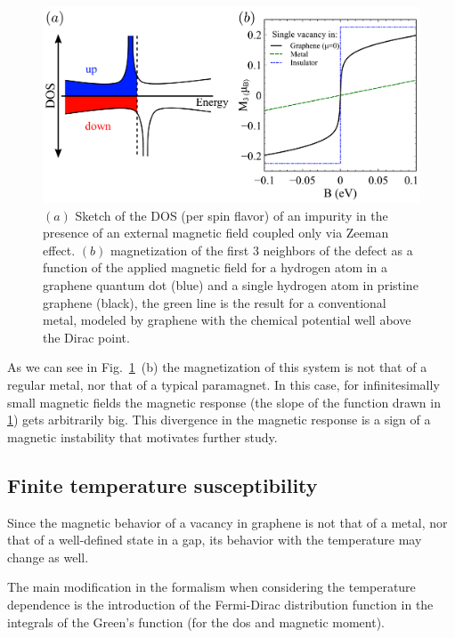 \begin{figure}[h!]
\centering
\includegraphics{chapter05/figures/comparison.pdf}
\vspace{-5pt}
\caption{$(a)$ Sketch of the DOS (per spin flavor) of an impurity in the presence of an external magnetic field coupled only via Zeeman effect. $(b)$ magnetization of the first 3 neighbors of the defect as a function of the applied magnetic field for a hydrogen atom in a graphene quantum dot (blue) and a single hydrogen atom in pristine graphene (black), the green line is the result for a conventional metal, modeled by graphene with the chemical potential well above the Dirac point.}
\label{magnetization}
\end{figure}

As we can see in Fig.~\ref{magnetization}~(b) the magnetization of this system is not that of a regular metal, nor that of a typical paramagnet. In this case, for infinitesimally small magnetic fields the magnetic response (the slope of the function drawn in \ref{magnetization}) gets arbitrarily big. This divergence in the magnetic response is a sign of a magnetic instability that motivates further study.




\subsection{Finite temperature susceptibility}
Since the magnetic behavior of a vacancy in graphene is not that of a metal, nor that of a well-defined state in a gap, its behavior with the temperature may change as well.

The main modification in the formalism when considering the temperature dependence is the introduction of the Fermi-Dirac distribution function in the integrals of the Green's function (for the \ac{dos} and magnetic moment).

